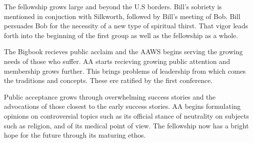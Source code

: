 
\bbChapterPreamble




    The fellowship grows large and beyond the U.S borders.
Bill's sobriety is mentioned in conjuction with Silkworth, 
    followed by Bill's meeting of Bob.
Bill persuades Bob for the necessity of a new type of spiritual thirst.
That vigor leads forth into the beginning of the first group 
    as well as the fellowship as a whole. 

    The Bigbook recieves public acclaim 
    and the AAWS begins serving the growing needs of those who suffer.
AA starts recieving growing public attention 
    and membership grows further.
This brings problems of leadership 
    from which comes the traditions and concepts.
These ere ratified by the first conference.

    Public acceptance grows 
    through overwhelming success stories 
    and the advocations of those closest 
    to the early success stories.
AA begins formulating opinions on controversial topics 
    such as its official stance of neutrality on subjects such as 
    religion, and of its medical point of view.
The fellowship now has a bright hope for the future 
    through its maturing ethos.


